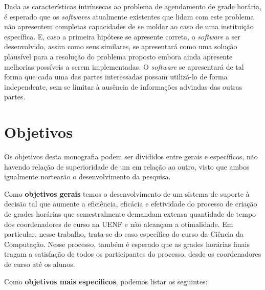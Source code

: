 Dada as características intrínsecas ao problema de agendamento de grade horária, é esperado que os \textit{softwares} atualmente existentes que lidam com este problema não apresentem completas capacidades de se moldar ao caso de uma instituição específica. E, caso a primeira hipótese se apresente correta, o \textit{software} a ser desenvolvido, assim como seus similares, se apresentará como uma solução plausível para a resolução do problema proposto embora ainda apresente melhorias possíveis a serem implementadas. O \textit{software} se apresentará de tal forma que cada uma das partes interessadas possam utilizá-lo de forma independente, sem se limitar à ausência de informações advindas das outras partes.

\section{Objetivos} \label{sec:Objetivos}                %

Os objetivos desta monografia podem ser divididos entre gerais e específicos, não havendo relação de superioridade de um em relação ao outro, visto que ambos igualmente nortearão o desenvolvimento da pesquisa.


Como \textbf{objetivos gerais} temos o desenvolvimento de um sistema de suporte à decisão tal que aumente a eficiência, eficácia e efetividade do processo de criação de grades horárias que semestralmente demandam extensa quantidade de tempo dos coordenadores de curso na UENF e não alcançam a otimalidade. Em particular, nesse trabalho, trata-se do caso específico do curso da Ciência da Computação. Nesse processo, também é esperado que as grades horárias finais tragam a satisfação de todos os participantes do processo, desde os coordenadores de curso até os alunos.


Como \textbf{objetivos mais específicos}, podemos listar os seguintes:

